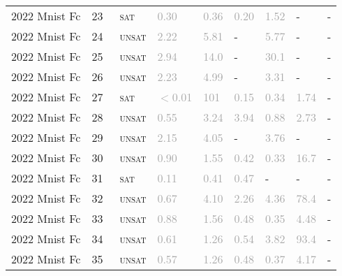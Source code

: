 \begin{center}
{\begin{longtable}{@{}lllllllll@{}}
2022 Mnist Fc & 23 & ~\textsc{sat} & \textcolor{darkgray}{0.30} & \textcolor{darkgray}{0.36} & \textcolor{darkgray}{0.20} & \textcolor{darkgray}{1.52} & - & - \\
2022 Mnist Fc & 24 & ~\textsc{unsat} & \textcolor{darkgray}{2.22} & \textcolor{darkgray}{5.81} & - & \textcolor{darkgray}{5.77} & - & - \\
2022 Mnist Fc & 25 & ~\textsc{unsat} & \textcolor{darkgray}{2.94} & \textcolor{darkgray}{14.0} & - & \textcolor{darkgray}{30.1} & - & - \\
2022 Mnist Fc & 26 & ~\textsc{unsat} & \textcolor{darkgray}{2.23} & \textcolor{darkgray}{4.99} & - & \textcolor{darkgray}{3.31} & - & - \\
2022 Mnist Fc & 27 & ~\textsc{sat} & \textcolor{darkgray}{$<$0.01} & \textcolor{darkgray}{101} & \textcolor{darkgray}{0.15} & \textcolor{darkgray}{0.34} & \textcolor{darkgray}{1.74} & - \\
2022 Mnist Fc & 28 & ~\textsc{unsat} & \textcolor{darkgray}{0.55} & \textcolor{darkgray}{3.24} & \textcolor{darkgray}{3.94} & \textcolor{darkgray}{0.88} & \textcolor{darkgray}{2.73} & - \\
2022 Mnist Fc & 29 & ~\textsc{unsat} & \textcolor{darkgray}{2.15} & \textcolor{darkgray}{4.05} & - & \textcolor{darkgray}{3.76} & - & - \\
2022 Mnist Fc & 30 & ~\textsc{unsat} & \textcolor{darkgray}{0.90} & \textcolor{darkgray}{1.55} & \textcolor{darkgray}{0.42} & \textcolor{darkgray}{0.33} & \textcolor{darkgray}{16.7} & - \\
2022 Mnist Fc & 31 & ~\textsc{sat} & \textcolor{darkgray}{0.11} & \textcolor{darkgray}{0.41} & \textcolor{darkgray}{0.47} & - & - & - \\
2022 Mnist Fc & 32 & ~\textsc{unsat} & \textcolor{darkgray}{0.67} & \textcolor{darkgray}{4.10} & \textcolor{darkgray}{2.26} & \textcolor{darkgray}{4.36} & \textcolor{darkgray}{78.4} & - \\
2022 Mnist Fc & 33 & ~\textsc{unsat} & \textcolor{darkgray}{0.88} & \textcolor{darkgray}{1.56} & \textcolor{darkgray}{0.48} & \textcolor{darkgray}{0.35} & \textcolor{darkgray}{4.48} & - \\
2022 Mnist Fc & 34 & ~\textsc{unsat} & \textcolor{darkgray}{0.61} & \textcolor{darkgray}{1.26} & \textcolor{darkgray}{0.54} & \textcolor{darkgray}{3.82} & \textcolor{darkgray}{93.4} & - \\
2022 Mnist Fc & 35 & ~\textsc{unsat} & \textcolor{darkgray}{0.57} & \textcolor{darkgray}{1.26} & \textcolor{darkgray}{0.48} & \textcolor{darkgray}{0.37} & \textcolor{darkgray}{4.17} & - \\

\end{longtable}}
\end{center}

